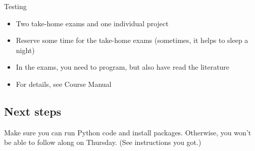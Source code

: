 \begin{frame}{Testing}
\begin{itemize}
	\item Two take-home exams and one individual project
	\item Reserve some time for the take-home exams (sometimes, it helps to sleep a night)
	\item In the exams, you need to program, but also have read the literature
	\item For details, see Course Manual
\end{itemize}
\end{frame}


\subsection{Next steps}


\begin{frame}[standout]
	Make sure you can run Python code and install packages. Otherwise, you won't be able to follow along on Thursday. (See instructions you got.)
\end{frame}


\begin{frame}
	\printbibliography
\end{frame}



